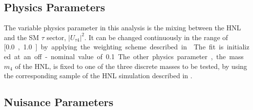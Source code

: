 

\subsection{Physics Parameters} 

The variable physics parameter in this analysis is the mixing between the HNL and the SM $\tau$ sector, $|U_{\tau4}|^2$. It can be changed continuously in the range of [\SI{0.0}, \SI{1.0}] by applying the weighting scheme described in . The fit is initialized at an off-nominal value of \SI{0.1}. The other physics parameter, the mass $m_4$ of the HNL, is fixed to one of the three discrete masses to be tested, by using the corresponding sample of the HNL simulation described in .


\subsection{Nuisance Parameters} 

